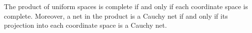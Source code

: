 The product of uniform spaces is complete if and only if each coordinate space is complete. Moreover, a net in the product is a Cauchy net if and only if its projection into each coordinate space is a Cauchy net.
